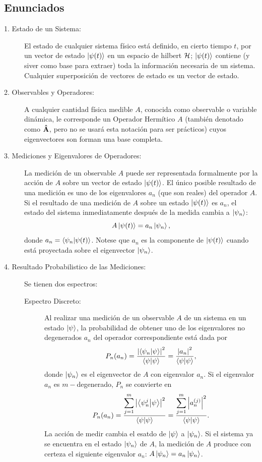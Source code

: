 \subsection{Enunciados}
\begin{description}
    \item[1. Estado de un Sistema: ] El estado de cualquier sistema físico está definido, en cierto tiempo $t$, por un vector de estado $\ket{\psi (t)}$ en un espacio de hilbert $\mathcal{H}$; $\ket{\psi (t)}$ contiene (y siver como base para extraer) toda la información necesaria de un sistema. Cualquier superposición de vectores de estado es un vector de estado.
    \item[2. Observables y Operadores: ] A cualquier cantidad física medible $A$, conocida como observable o variable dinámica, le corresponde un Operador Hermítico $A$ (también denotado como $\vu{A}$, pero no se usará esta notación para ser prácticos) cuyos eigenvectores son forman una base completa.
    \item[3. Mediciones y Eigenvalores de Operadores: ] La medición de un observable $A$ puede ser representada formalmente por la acción de $A$ sobre un vector de estado $\ket{\psi (t)}$. El único posible resultado de una medición es uno de los eigenvalores $a_n$ (que son reales) del operador $A$. Si el resultado de una medición de $A$ sobre un estado $\ket{\psi (t)}$ es $a_n$, el estado del sistema inmediatamente después de la medida cambia a $\ket{\psi_{n} }$:
        $$ A\ket{\psi (t)} = a_n \ket{\psi_{n} }, $$
    donde $a_n = \braket{\psi _n}{\psi (t)}$. Notese que $a_n$ es la componente de $\ket{\psi (t)}$ cuando está proyectada sobre el eigenvector $\ket{\psi_{n} }$.
    \item[4. Resultado Probabilistico de las Mediciones: ] Se tienen dos espectros:
        \begin{description}
            \item[Espectro Discreto: ] Al realizar una medición de un observable $A$ de un sistema en un estado $\ket{\psi}$, la probabilidad de obtener uno de los eigenvalores no degenerados $a_n$ del operador correspondiente está dada por
                $$ P_n (a_n) =  \frac{\abs{\braket{\psi _n}{\psi}}^2}{\braket{\psi}} = \frac{\abs{a_n}^2}{\braket{\psi}}, $$
            donde $\ket{\psi_{n} }$ es el eigenvector de $A$ con eigenvalor $a_n$. Si el eigenvalor $a_n$ es $m-$degenerado, $P_n$ se convierte en
                $$ P_n (a_n) = \frac{\displaystyle\sum_{j=1} ^{m} \abs{\braket{\psi _n ^j}{\psi}}^2}{\braket{\psi}} = \frac{\displaystyle\sum_{j=1} ^{m} \abs{a_n^{(j)}}^2}{\braket{\psi}}. $$
            La acción de medir cambia el esatdo de $\ket{\psi}$ a $\ket{\psi_{n} }$. Si el sistema ya se encuentra en el estado $\ket{\psi_{n} }$ de $A$, la medición de $A$ produce con certeza el siguiente eigenvalor $a_n$: $A\ket{\psi_{n} } = a_n \ket{\psi_{n} }$.

\end{description}
\end{description}
